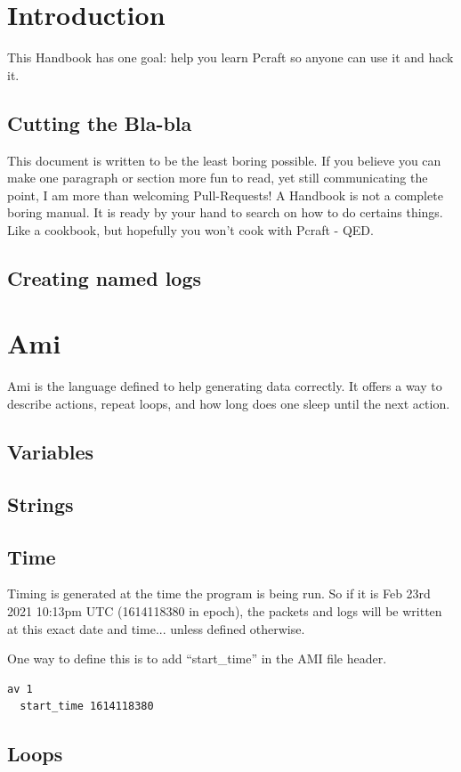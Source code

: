 \documentclass[10pt]{article}
\begin{document}
\newpage

\tableofcontents

\newpage

\section{Introduction}

This Handbook has one goal: help you learn Pcraft so anyone can use it and hack it.

\subsection{Cutting the Bla-bla}

This document is written to be the least boring possible. If you believe you can make one paragraph or section more fun to read, yet still communicating the point, I am more than welcoming Pull-Requests! A Handbook is not a complete boring manual. It is ready by your hand to search on how to do certains things. Like a cookbook, but hopefully you won't cook with Pcraft - QED.

\subsection{Creating named logs}


\section{Ami}

Ami is the language defined to help generating data correctly. It offers a way to describe actions, repeat loops, and how long does one sleep until the next action.

\subsection{Variables}

\subsection{Strings}

\subsection{Time}

Timing is generated at the time the program is being run. So if it is Feb 23rd 2021 10:13pm UTC (1614118380 in epoch), the packets and logs will be written at this exact date and time... unless defined otherwise.

One way to define this is to add ``start\_time'' in the AMI file header.

\begin{lstlisting}[caption={Setting start time},captionpos=b]
  av 1
  start_time 1614118380
\end{lstlisting}



\subsection{Loops}
\end{document}

